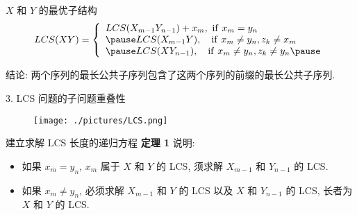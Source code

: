 \documentclass[fontset=fandol,UTF8,fleqn]{beamer}
\begin{document}
\begin{frame}{$X$ 和 $Y$ 的最优子结构}
\begin{eqnarray*}
  LCS(XY)  = \left\{\begin{array}{ll}
 LCS(X_{m-1}Y_{n-1})+ x_m, \ \mathrm{if}\ x_m=y_n   \\ \pause
LCS(X_{m-1}Y), \quad \mathrm{if}\ x_m\neq y_n, z_k\neq x_m   \\ \pause
LCS(XY_{n-1}), \quad \mathrm{if}\ x_m\neq y_n, z_k\neq y_n  \pause
\end{array}\right.
\end{eqnarray*}

结论: 两个序列的最长公共子序列包含了这两个序列的前缀的最长公共子序列.
 
\end{frame}



\begin{frame}{3. LCS 问题的子问题重叠性}
\begin{figure}
  \centering
  \texttt{[image: ./pictures/LCS.png]}%
\end{figure}
\end{frame}

\begin{frame}{建立求解 LCS 长度的递归方程}
\textbf{定理 1} 说明:  
  \begin{itemize}[<+-|alert@+>]
\item 如果 $x_m = y_n$,  $x_m$ 属于 $X$ 和 $Y$ 的 LCS,  须求解 $X_{m-1}$
和 $Y_{n-1}$ 的 LCS.  
\item 如果 $x_m\neq y_n$, 必须求解 $X_{m-1}$ 和 $Y$ 的 LCS 以及 $X$ 和
$Y_{n-1}$ 的 LCS,  长者为 $X$ 和 $Y$ 的 LCS. 
\end{itemize}
\end{frame}
\end{document}
